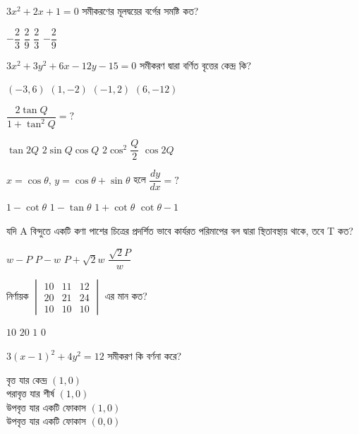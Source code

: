 \documentclass[addpoints]{exam}
\begin{document}
\begin{questions}
\question $ 3x^{2}+2x+1=0 $ সমীকরণের মূলদ্বয়ের বর্গের সমষ্টি কত?

\begin{oneparchoices}
\choice $ -\dfrac{2}{3} $
\choice  $ \dfrac{2}{9} $
\choice $ \dfrac{2}{3} $
\choice $ -\dfrac{2}{9} $  
\end{oneparchoices}

\question  $ 3x^{2}+3y^{2}+6x-12y-15=0  $ সমীকরণ দ্বারা বর্ণিত বৃত্তের কেন্দ্র কি?

\begin{oneparchoices}
\choice $ (-3,6) $
\choice $ (1,-2) $
\choice $ (-1,2) $
\choice $ (6,-12) $
\end{oneparchoices}

\question $ \dfrac{2\tan Q}{1+\tan^{2} Q} =?  $  

\begin{oneparchoices}
\choice $ \tan 2Q $
\choice $ 2\sin Q\cos Q $
\choice $ 2\cos^{2}\dfrac{Q}{2} $
\choice $ \cos 2Q $
\end{oneparchoices}

\question $ x=\cos\theta,\, y= \cos\theta +\sin\theta $  হলে $ \dfrac{dy}{dx} = ? $

\begin{oneparchoices}
\choice $ 1-\cot\theta $
\choice $ 1-\tan\theta $
\choice $ 1+\cot\theta $
\choice $ \cot\theta - 1 $
\end{oneparchoices}


\question  যদি A বিন্দুতে একটি কণা পাশের চিত্রের প্রদর্শিত ভাবে কার্যরত পরিমাপের বল দ্বারা স্থিতাবস্থায় থাকে, তবে T কত?

\begin{oneparchoices}
\choice  $ w-P $
\choice  $ P-w $ 
\choice  $ P+\sqrt{2} w$
\choice  $ \dfrac{\sqrt{2}P}{w} $ 
\end{oneparchoices}


\question  নির্ণায়ক $ \begin{vmatrix}
10 & 11 & 12\\
20 & 21 & 24\\
10 & 10 & 10
\end{vmatrix} $ এর মান কত?

\begin{oneparchoices}
\choice $ 10 $
\choice $ 20 $
\choice $ 1 $
\choice $ 0 $
\end{oneparchoices}

\question $ 3(x-1)^{2}+4y^{2}=12 $ সমীকরণ কি বর্ণনা করে?

\begin{oneparchoices}
\choice বৃত্ত যার কেন্দ্র $(1,0)$ \\
\hspace*{-.3cm}\choice পরাবৃত্ত যার শীর্ষ $(1,0)$\\ 
\hspace*{-.3cm}\choice উপবৃত্ত যার একটি ফোকাস $(1,0)$\\
\hspace*{-.3cm}\choice উপবৃত্ত যার একটি ফোকাস $(0,0)$
\end{oneparchoices}


\end{questions}
\end{document}
